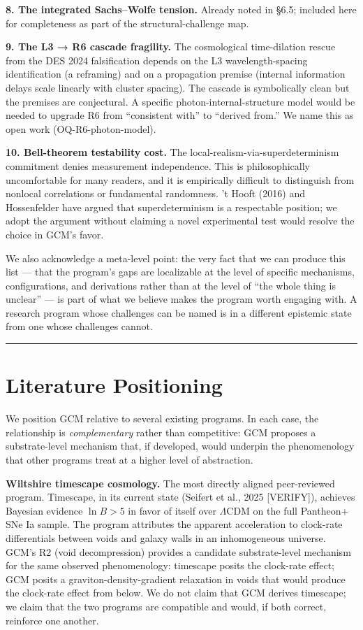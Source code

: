 \documentclass[12pt]{article}
\theoremstyle{definition}
\theoremstyle{remark}
\begin{document}
\textbf{8. The integrated Sachs--Wolfe tension.} Already noted in §6.5;
included here for completeness as part of the structural-challenge map.

\textbf{9. The L3 → R6 cascade fragility.} The cosmological
time-dilation rescue from the DES 2024 falsification depends on the L3
wavelength-spacing identification (a reframing) and on a propagation
premise (internal information delays scale linearly with cluster
spacing). The cascade is symbolically clean but the premises are
conjectural. A specific photon-internal-structure model would be needed
to upgrade R6 from ``consistent with'' to ``derived from.'' We name this
as open work (OQ-R6-photon-model).

\textbf{10. Bell-theorem testability cost.} The
local-realism-via-superdeterminism commitment denies measurement
independence. This is philosophically uncomfortable for many readers,
and it is empirically difficult to distinguish from nonlocal
correlations or fundamental randomness. 't Hooft (2016) and Hossenfelder
have argued that superdeterminism is a respectable position; we adopt
the argument without claiming a novel experimental test would resolve
the choice in GCM's favor.

We also acknowledge a meta-level point: the very fact that we can
produce this list --- that the program's gaps are localizable at the
level of specific mechanisms, configurations, and derivations rather
than at the level of ``the whole thing is unclear'' --- is part of what
we believe makes the program worth engaging with. A research program
whose challenges can be named is in a different epistemic state from one
whose challenges cannot.

\begin{center}\rule{0.5\linewidth}{0.5pt}\end{center}

\section{Literature Positioning}\label{sec:literature}

We position GCM relative to several existing programs. In each case, the
relationship is \emph{complementary} rather than competitive: GCM
proposes a substrate-level mechanism that, if developed, would underpin
the phenomenology that other programs treat at a higher level of
abstraction.

\textbf{Wiltshire timescape cosmology.} The most directly aligned
peer-reviewed program. Timescape, in its current state (Seifert et al.,
2025 {[}VERIFY{]}), achieves Bayesian evidence \(\ln B > 5\) in favor of
itself over \(\Lambda\)CDM on the full Pantheon+ SNe Ia sample. The
program attributes the apparent acceleration to clock-rate differentials
between voids and galaxy walls in an inhomogeneous universe. GCM's R2
(void decompression) provides a candidate substrate-level mechanism for
the same observed phenomenology: timescape posits the clock-rate effect;
GCM posits a graviton-density-gradient relaxation in voids that would
produce the clock-rate effect from below. We do not claim that GCM
derives timescape; we claim that the two programs are compatible and
would, if both correct, reinforce one another.
\end{document}
